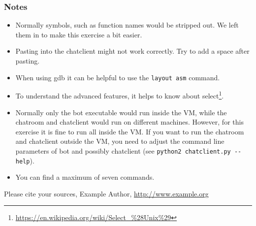 \documentclass[a4paper,11pt]{article}
\begin{document}
\subsubsection*{Notes}
\begin{itemize}
\item Normally symbols, such as function names would be stripped out. We left
them in to make this exercise a bit easier.
\item Pasting into the chatclient might not work correctly. Try to add a space
after pasting.
\item When using gdb it can be helpful to use the \verb|layout asm| command.
\item To understand the advanced features, it helps to know about
select\footnote{\url{https://en.wikipedia.org/wiki/Select_\%28Unix\%29}}.
\item Normally only the bot executable would run inside the VM, while the
chatroom and chatclient would run on different machines. However, for this
exercise it is fine to run all inside the VM. If you want to run the chatroom
and chatclient outside the VM, you need to adjust the command line parameters of
bot and possibly chatclient (see \verb|python2 chatclient.py --help|).
\item You can find a maximum of seven commands.
\end{itemize}



\begin{thebibliography}{---}
 Please cite your sources, Example Author, \url{http://www.example.org}
\end{thebibliography}
\end{document}
